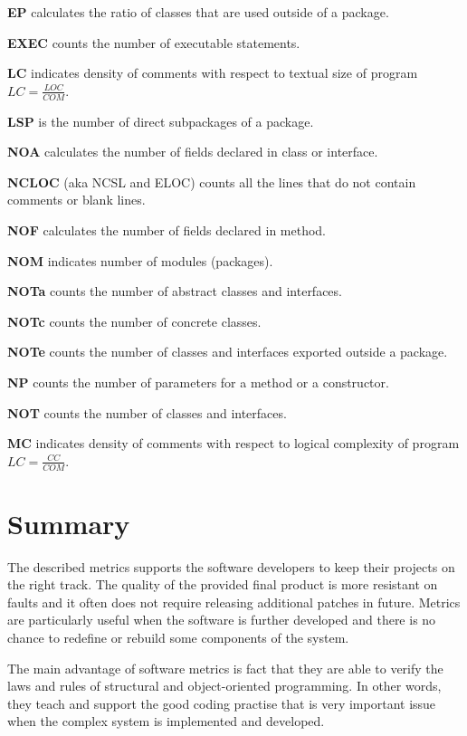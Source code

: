 \textbf{\ac{EP}}  calculates the ratio of classes that are used outside of a package.

\textbf{\ac{EXEC}} counts the number of executable statements.	

\textbf{\ac{LC}} indicates density of comments with respect to textual size of program $LC=\frac {LOC}{COM}$.

\textbf{\ac{LSP}} is the number of direct subpackages of a package.

\textbf{\ac{NOA}}  calculates the number of fields declared in class or interface.

\textbf{\ac{NCLOC}} (aka NCSL and ELOC) counts all the lines that do not contain comments or blank lines.

\textbf{\ac{NOF}}  calculates the number of fields declared in method.

\textbf{\ac{NOM}} indicates number of modules (packages).

\textbf{\ac{NOTa}} counts the number of abstract classes and interfaces.

\textbf{\ac{NOTc}} counts the number of concrete classes.	

\textbf{\ac{NOTe}} counts the number of classes and interfaces exported outside a package.

\textbf{\ac{NP}} counts the number of parameters for a method or a constructor.

\textbf{\ac{NOT}} counts the number of classes and interfaces.

\textbf{\ac{MC}} indicates density of comments with respect to logical complexity of program $LC=\frac { CC }{ COM } $.

\section{Summary}
The described metrics supports the software developers to keep their projects on the right track. The quality of the provided final product is more resistant on faults and it often does not require releasing additional patches in future. Metrics are particularly useful when the software is further developed and there is no chance to redefine or rebuild some components of the system.

The main advantage of software metrics is fact that they are able to verify the laws and rules of structural and object-oriented programming. In other words, they teach and support the good coding practise that is very important issue when the complex system is implemented and developed.

